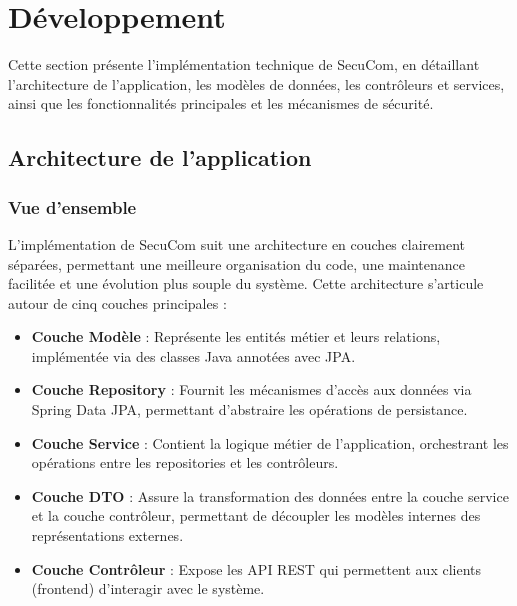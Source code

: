 \chapter{Développement}

Cette section présente l'implémentation technique de SecuCom, en détaillant l'architecture de l'application, les modèles de données, les contrôleurs et services, ainsi que les fonctionnalités principales et les mécanismes de sécurité.

\section{Architecture de l'application}

\subsection{Vue d'ensemble}

L'implémentation de SecuCom suit une architecture en couches clairement séparées, permettant une meilleure organisation du code, une maintenance facilitée et une évolution plus souple du système. Cette architecture s'articule autour de cinq couches principales :

\vspace{0.5cm}

\begin{itemize}[leftmargin=*,label=\textcolor{darkgray}{$\bullet$},itemsep=0.3em]
  \item \textbf{Couche Modèle} : Représente les entités métier et leurs relations, implémentée via des classes Java annotées avec JPA.
  \item \textbf{Couche Repository} : Fournit les mécanismes d'accès aux données via Spring Data JPA, permettant d'abstraire les opérations de persistance.
  \item \textbf{Couche Service} : Contient la logique métier de l'application, orchestrant les opérations entre les repositories et les contrôleurs.
  \item \textbf{Couche DTO} : Assure la transformation des données entre la couche service et la couche contrôleur, permettant de découpler les modèles internes des représentations externes.
  \item \textbf{Couche Contrôleur} : Expose les API REST qui permettent aux clients (frontend) d'interagir avec le système.
\end{itemize}

\vspace{0.5cm}

